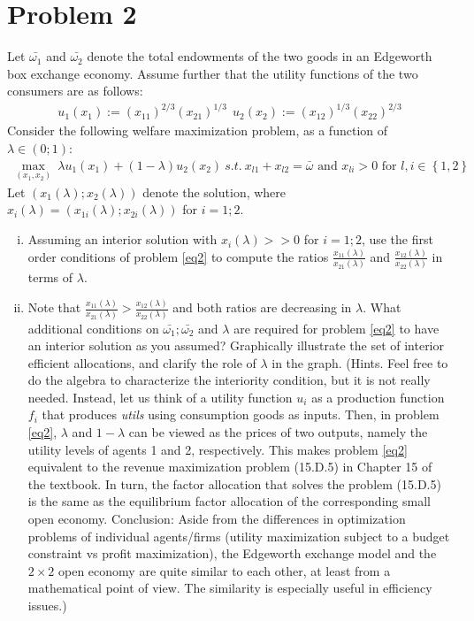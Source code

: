 \documentclass[a4paper]{article}
\begin{document}
\section*{Problem 2}
Let $\bar{\omega_1}$ and $\bar{\omega_2}$ denote the total endowments of the two goods in an Edgeworth box
exchange economy. Assume further that the utility functions of the two consumers are as
follows:
\begin{align*}
u_1(x_1) := (x_{11})^{2/3}(x_{21})^{1/3}\ \ 
u_2(x_2) := (x_{12})^{1/3}(x_{22})^{2/3}
\end{align*}
Consider the following welfare maximization problem, as a function of $\lambda \in (0; 1)$:
\begin{align} \label{eq2}
\underset{(x_1, x_2)}{\max}\ \lambda u_1(x_1) + (1 - \lambda)u_2(x_2)\ s.t.\ x_{l1} + x_{l2} = \bar{\omega} \text{ and } x_{li} > 0 \text{ for } l, i \in \left\{1, 2\right\}
\end{align}
Let $(x_1(\lambda); x_2(\lambda))$ denote the solution, where $x_i(\lambda) = (x_{1i}(\lambda); x_{2i}(\lambda))$ for $i = 1; 2.$
\begin{enumerate}[(i)]
\item Assuming an interior solution with $x_i(\lambda) >> 0$ for $i = 1; 2$, use the first order conditions
of problem \eqref{eq2} to compute the ratios $\frac{x_{11}(\lambda)}{
x_{21}(\lambda)}$
and $\frac{x_{12}(\lambda)}{
x_{22}(\lambda)}$
in terms of $\lambda$.
\item  Note that $\frac{x_{11}(\lambda)}{x_{21}(\lambda)} >\frac{x_{12}(\lambda)}{x_{22}(\lambda)}$
and both ratios are decreasing in $\lambda$. What additional conditions
on $\bar{\omega_1}; \bar{\omega_2}$ and $\lambda$ are required for problem \eqref{eq2} to have an interior solution as you assumed?
Graphically illustrate the set of interior efficient allocations, and clarify the role of $\lambda$ in
the graph. (Hints. Feel free to do the algebra to characterize the interiority condition,
but it is not really needed. Instead, let us think of a utility function $u_i$ as a production
function $f_i$ that produces \textit{utils} using consumption goods as inputs. Then, in problem \eqref{eq2},
$\lambda$ and $1-\lambda$ can be viewed as the prices of two outputs, namely the utility levels of agents 1
and 2, respectively. This makes problem \eqref{eq2} equivalent to the revenue maximization problem
(15.D.5) in Chapter 15 of the textbook. In turn, the factor allocation that solves the problem
(15.D.5) is the same as the equilibrium factor allocation of the corresponding small open
economy. Conclusion: Aside from the differences in optimization problems of individual
agents/firms (utility maximization subject to a budget constraint vs profit maximization),
the Edgeworth exchange model and the $2 \times 2$ open economy are quite similar to each other,
at least from a mathematical point of view. The similarity is especially useful in efficiency
issues.)
\end{enumerate}
\end{document}
